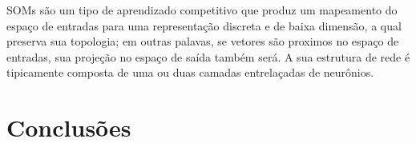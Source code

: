 \documentclass[conference]{IEEEtran}
\begin{document}
	SOMs são um tipo de aprendizado competitivo que produz um mapeamento do espaço de entradas para uma representação discreta e de baixa dimensão, a qual preserva sua topologia; em outras palavas, se vetores são proximos no espaço de entradas, sua projeção no espaço de saída também será. A sua estrutura de rede é tipicamente composta de uma ou duas camadas entrelaçadas de neurônios. 
	
			
	\section{Conclusões}


    
	
	
\end{document}
